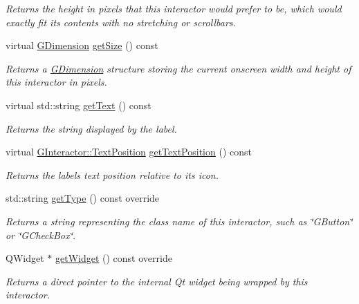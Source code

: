 \begin{DoxyCompactItemize}
\begin{DoxyCompactList}\small\item\em Returns the height in pixels that this interactor would prefer to be, which would exactly fit its contents with no stretching or scrollbars. \end{DoxyCompactList}\item 
virtual \mbox{\hyperlink{structsgl_1_1GDimension}{G\+Dimension}} \mbox{\hyperlink{classsgl_1_1GInteractor_a7b4eec96a2bdc6420695d5796a78eea9}{get\+Size}} () const
\begin{DoxyCompactList}\small\item\em Returns a \mbox{\hyperlink{structsgl_1_1GDimension}{G\+Dimension}} structure storing the current onscreen width and height of this interactor in pixels. \end{DoxyCompactList}\item 
virtual std\+::string \mbox{\hyperlink{classsgl_1_1GLabel_aff553c50924b836c29f146ed34a7c6ec}{get\+Text}} () const
\begin{DoxyCompactList}\small\item\em Returns the string displayed by the label. \end{DoxyCompactList}\item 
virtual \mbox{\hyperlink{classsgl_1_1GInteractor_a8e0d441725a81d2bbdebbea09078260e}{G\+Interactor\+::\+Text\+Position}} \mbox{\hyperlink{classsgl_1_1GLabel_a3fc623df3ced62aca93fc344c2426899}{get\+Text\+Position}} () const
\begin{DoxyCompactList}\small\item\em Returns the label\textquotesingle{}s text position relative to its icon. \end{DoxyCompactList}\item 
std\+::string \mbox{\hyperlink{classsgl_1_1GLabel_a9b72ede4ee8520f987a0c01e30654814}{get\+Type}} () const override
\begin{DoxyCompactList}\small\item\em Returns a string representing the class name of this interactor, such as \char`\"{}\+G\+Button\char`\"{} or \char`\"{}\+G\+Check\+Box\char`\"{}. \end{DoxyCompactList}\item 
Q\+Widget $\ast$ \mbox{\hyperlink{classsgl_1_1GLabel_a3b33a602b31a6b809d020535a59db3b4}{get\+Widget}} () const override
\begin{DoxyCompactList}\small\item\em Returns a direct pointer to the internal Qt widget being wrapped by this interactor. \end{DoxyCompactList}\item 

\end{DoxyCompactItemize}
